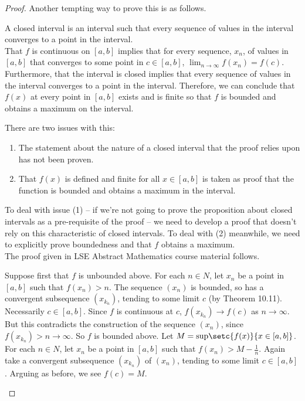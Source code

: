 \documentclass[MathsNotesBase.tex]{subfiles}
\begin{document}
{\begin{proof}
			Another tempting way to prove this is as follows.\\
			
			\begin{displayquote}
			A closed interval is an interval such that every sequence of values in the interval converges to a point in the interval.\\ 
			That $f$ is continuous on ${ [a,b] }$ implies that for every sequence, $x_n$, of values in ${ [a,b] }$ that converges to some point in ${ c \in [a,b] }$, ${ \lim_{n \to \infty} f(x_n) = f(c) }$. Furthermore, that the interval is closed implies that every sequence of values in the interval converges to a point in the interval. Therefore, we can conclude that $f(x)$ at every point in ${ [a,b] }$ exists and is finite so that $f$ is bounded and obtains a maximum on the interval.\\
			\end{displayquote}
			
			There are two issues with this:
			\begin{enumerate}
				\item{The statement about the nature of a closed interval that the proof relies upon has not been proven.}
				\item{That $f(x)$ is defined and finite for all ${ x \in [a,b] }$ is taken as proof that the function is bounded and obtains a maximum in the interval.}
			\end{enumerate}
			To deal with issue (1) -- if we're not going to prove the proposition about closed intervals as a pre-requisite of the proof -- we need to develop a proof that doesn't rely on this characteristic of closed intervals. To deal with (2) meanwhile, we need to explicitly prove boundedness and that $f$ obtains a maximum.\\
			The proof given in LSE Abstract Mathematics course material follows.\\
			
			\begin{displayquote}
			Suppose first that $ f $ is unbounded above. For each ${ n \in N }$, let $ x_n $ be a point in ${ [a, b] }$ such that ${ f(x_n) > n }$. The sequence $ (x_n) $ is bounded, so has a convergent subsequence ${ (x_{k_n}) }$, tending to some limit $ c $ (by Theorem 10.11). Necessarily ${ c \in [a, b] }$. Since $ f $ is continuous at $ c $, ${ f(x_{k_n}) \to f(c) }$ as ${ n \to \infty }$. But this contradicts the construction of the sequence $ (x_n) $, since ${ f(x_{k_n}) > n \to \infty }$. So $ f $ is bounded above. Let ${ M = \text{sup}\setc{f(x)}{x \in [a, b]} }$. For each ${ n \in N }$, let $ x_n $ be a point in ${ [a, b] }$ such that ${ f(x_n) > M - \frac{1}{n} }$. Again take a convergent subsequence ${ (x_{k_n}) }$ of $ (x_n) $, tending to some limit ${ c \in [a, b] }$. Arguing as before, we see ${ f(c) = M }$.
			\end{displayquote}
		

\end{proof}}
\end{document}
